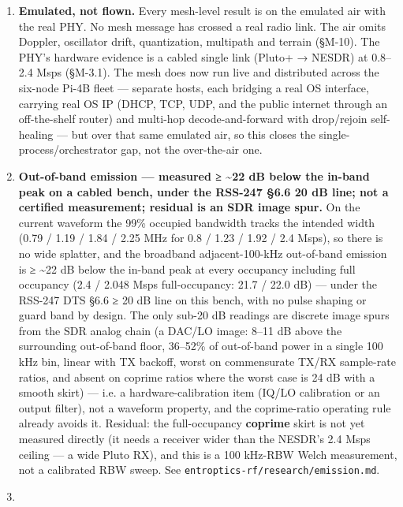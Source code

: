 \documentclass[10pt,letterpaper,twocolumn]{article}
\providecommand{\tightlist}{\setlength{\itemsep}{0pt}\setlength{\parskip}{0pt}}
\begin{document}
\begin{enumerate}
\def\labelenumi{\arabic{enumi}.}
\tightlist
\item
  \textbf{Emulated, not flown.} Every mesh-level result is on the emulated air with the real PHY. No mesh message has crossed a real radio link. The air omits Doppler, oscillator drift, quantization, multipath and terrain (§M-10). The PHY's hardware evidence is a cabled single link (Pluto+ → NESDR) at 0.8--2.4 Msps (§M-3.1). The mesh does now run live and distributed across the six-node Pi-4B fleet --- separate hosts, each bridging a real OS interface, carrying real OS IP (DHCP, TCP, UDP, and the public internet through an off-the-shelf router) and multi-hop decode-and-forward with drop/rejoin self-healing --- but over that same emulated air, so this closes the single-\allowbreak{}process/\allowbreak{}orchestr\allowbreak{}ator gap, not the over-the-air one.
\item
  \textbf{Out-of-band emission --- measured ≥ \textasciitilde22 dB below the in-band peak on a cabled bench, under the RSS-247 §6.6 20 dB line; not a certified measurement; residual is an SDR image spur.} On the current waveform the 99\% occupied bandwidth tracks the intended width (0.79 / 1.19 / 1.84 / 2.25 MHz for 0.8 / 1.23 / 1.92 / 2.4 Msps), so there is no wide splatter, and the broadband adjacent-100-kHz out-of-band emission is ≥ \textasciitilde22 dB below the in-band peak at every occupancy including full occupancy (2.4 / 2.048 Msps full-occupancy: 21.7 / 22.0 dB) --- under the RSS-247 DTS §6.6 ≥ 20 dB line on this bench, with no pulse shaping or guard band by design. The only sub-20 dB readings are discrete image spurs from the SDR analog chain (a DAC/LO image: 8--11 dB above the surrounding out-of-band floor, 36--52\% of out-of-band power in a single 100 kHz bin, linear with TX backoff, worst on commensurate TX/RX sample-rate ratios, and absent on coprime ratios where the worst case is 24 dB with a smooth skirt) --- i.e. a hardware-calibration item (IQ/LO calibration or an output filter), not a waveform property, and the coprime-ratio operating rule already avoids it. Residual: the full-occupancy \textbf{coprime} skirt is not yet measured directly (it needs a receiver wider than the NESDR's 2.4 Msps ceiling --- a wide Pluto RX), and this is a 100 kHz-RBW Welch measurement, not a calibrated RBW sweep. See \texttt{entroptics-{}\allowbreak{}rf/\allowbreak{}research/\allowbreak{}emission.\allowbreak{}md}.
\item

\end{enumerate}
\end{document}

